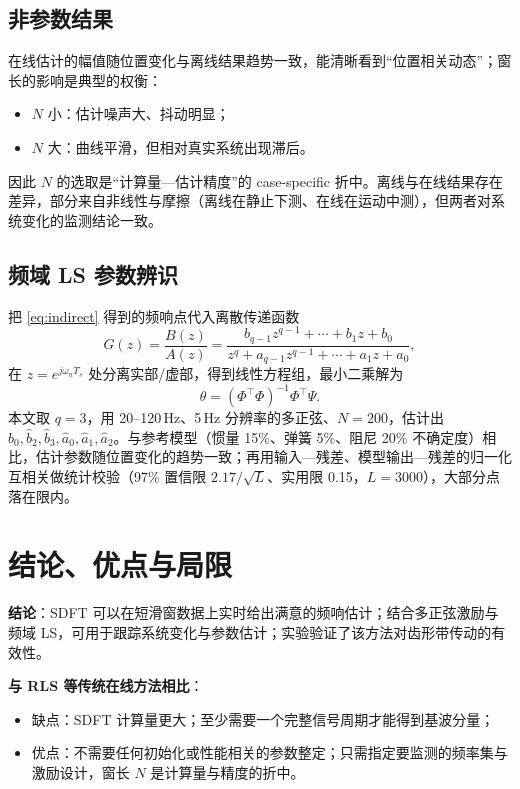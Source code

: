 \documentclass[UTF8,a4paper,11pt]{ctexart}
\begin{document}
\subsection{非参数结果}
在线估计的幅值随位置变化与离线结果趋势一致，能清晰看到“位置相关动态”；窗长的影响是典型的权衡：
\begin{itemize}
  \item $N$ 小：估计噪声大、抖动明显；
  \item $N$ 大：曲线平滑，但相对真实系统出现滞后。
\end{itemize}
因此 $N$ 的选取是“计算量—估计精度”的 case-specific 折中。离线与在线结果存在差异，部分来自非线性与摩擦（离线在静止下测、在线在运动中测），但两者对系统变化的监测结论一致。

\subsection{频域 LS 参数辨识}
把 \eqref{eq:indirect} 得到的频响点代入离散传递函数
\begin{equation}
G(z)=\frac{B(z)}{A(z)}=\frac{b_{q-1}z^{q-1}+\cdots+b_1z+b_0}{z^{q}+a_{q-1}z^{q-1}+\cdots+a_1z+a_0},
\end{equation}
在 $z=e^{j\omega_nT_s}$ 处分离实部/虚部，得到线性方程组，最小二乘解为
\begin{equation}
\theta=\left(\Phi^{\top}\Phi\right)^{-1}\Phi^{\top}\Psi .
\end{equation}
本文取 $q=3$，用 20--120\,Hz、5\,Hz 分辨率的多正弦、$N=200$，估计出 $\hat b_0,\hat b_2,\hat b_3,\hat a_0,\hat a_1,\hat a_2$。与参考模型（惯量 15\%、弹簧 5\%、阻尼 20\% 不确定度）相比，估计参数随位置变化的趋势一致；再用输入—残差、模型输出—残差的归一化互相关做统计校验（97\% 置信限 $2.17/\sqrt{L}$、实用限 0.15，$L=3000$），大部分点落在限内。

\section{结论、优点与局限}
\textbf{结论}：SDFT 可以在短滑窗数据上实时给出满意的频响估计；结合多正弦激励与频域 LS，可用于跟踪系统变化与参数估计；实验验证了该方法对齿形带传动的有效性。

\textbf{与 RLS 等传统在线方法相比}：
\begin{itemize}
  \item 缺点：SDFT 计算量更大；至少需要一个完整信号周期才能得到基波分量；
  \item 优点：不需要任何初始化或性能相关的参数整定；只需指定要监测的频率集与激励设计，窗长 $N$ 是计算量与精度的折中。
\end{itemize}
\end{document}
